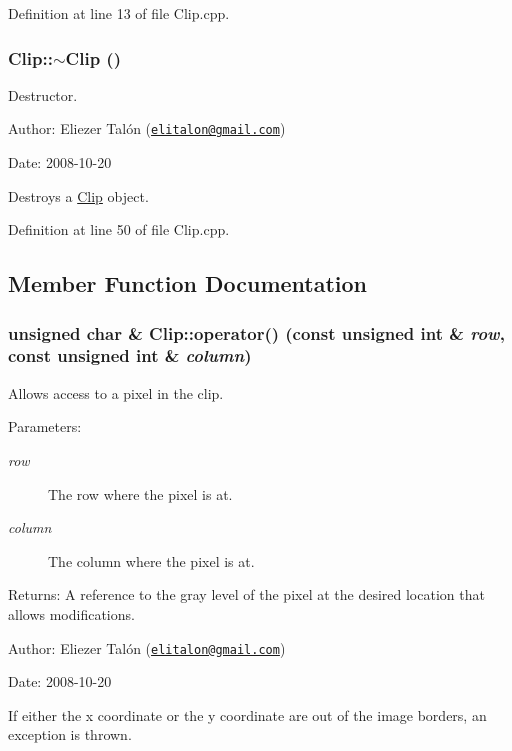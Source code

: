 Definition at line 13 of file Clip.cpp.\hypertarget{class_clip_88647ed65e3482b5e0533ec98667b0fa}{
\subsubsection[$\sim$Clip]{\setlength{\rightskip}{0pt plus 5cm}Clip::$\sim$Clip ()}}
\label{class_clip_88647ed65e3482b5e0533ec98667b0fa}


Destructor. 

\begin{Desc}
\item[Author:]Eliezer Talón (\href{mailto:elitalon@gmail.com}{\tt elitalon@gmail.com}) \end{Desc}
\begin{Desc}
\item[Date:]2008-10-20\end{Desc}
Destroys a \hyperlink{class_clip}{Clip} object. 

Definition at line 50 of file Clip.cpp.

\subsection{Member Function Documentation}
\hypertarget{class_clip_0f80c2b0f0f177fe9c780c93596f77be}{
\subsubsection[operator()]{\setlength{\rightskip}{0pt plus 5cm}unsigned char \& Clip::operator() (const unsigned int \& {\em row}, \/  const unsigned int \& {\em column})}}
\label{class_clip_0f80c2b0f0f177fe9c780c93596f77be}


Allows access to a pixel in the clip. 

\begin{Desc}
\item[Parameters:]
\begin{description}
\item[{\em row}]The row where the pixel is at. \item[{\em column}]The column where the pixel is at.\end{description}
\end{Desc}
\begin{Desc}
\item[Returns:]A reference to the gray level of the pixel at the desired location that allows modifications.\end{Desc}
\begin{Desc}
\item[Author:]Eliezer Talón (\href{mailto:elitalon@gmail.com}{\tt elitalon@gmail.com}) \end{Desc}
\begin{Desc}
\item[Date:]2008-10-20\end{Desc}
If either the x coordinate or the y coordinate are out of the image borders, an exception is thrown. 

